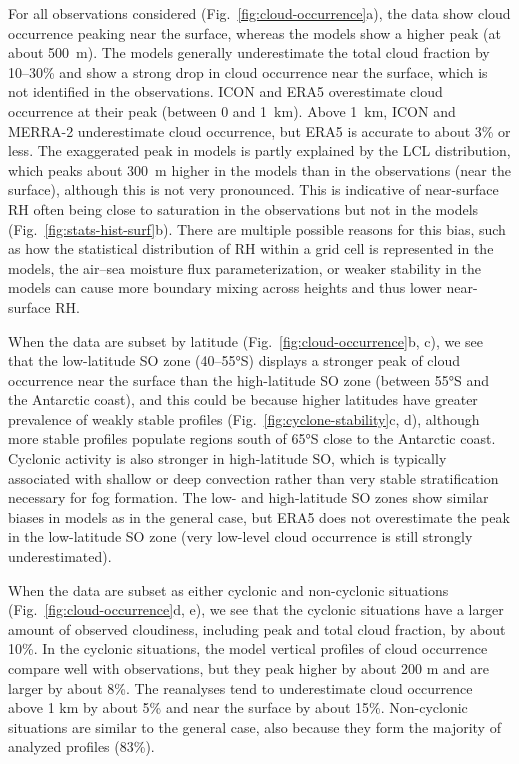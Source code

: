 \documentclass[draft]{agujournal2019}
\begin{document}
For all observations considered (Fig.~\ref{fig:cloud-occurrence}a), the data show cloud occurrence peaking near the surface, whereas the models show a higher peak (at about 500~m). The models generally underestimate the total cloud fraction by 10--30\% and show a strong drop in cloud occurrence near the surface, which is not identified in the observations. ICON and ERA5 overestimate cloud occurrence at their peak (between 0 and 1~km). Above 1~km, ICON and MERRA-2 underestimate cloud occurrence, but ERA5 is accurate to about 3\% or less. The exaggerated peak in models is partly explained by the LCL distribution, which peaks about 300~m higher in the models than in the observations (near the surface), although this is not very pronounced. This is indicative of near-surface RH often being close to saturation in the observations but not in the models (Fig.~\ref{fig:stats-hist-surf}b). There are multiple possible reasons for this bias, such as how the statistical distribution of RH within a grid cell is represented in the models, the air--sea moisture flux parameterization, or weaker stability in the models can cause more boundary mixing across heights and thus lower near-surface RH.

When the data are subset by latitude (Fig.~\ref{fig:cloud-occurrence}b, c), we see that the low-latitude SO zone (40--55°S) displays a stronger peak of cloud occurrence near the surface than the high-latitude SO zone (between 55°S and the Antarctic coast), and this could be because higher latitudes have greater prevalence of weakly stable profiles (Fig.~\ref{fig:cyclone-stability}c, d), although more stable profiles populate regions south of 65°S close to the Antarctic coast. Cyclonic activity is also stronger in high-latitude SO, which is typically associated with shallow or deep convection rather than very stable stratification necessary for fog formation. The low- and high-latitude SO zones show similar biases in models as in the general case, but ERA5 does not overestimate the peak in the low-latitude SO zone (very low-level cloud occurrence is still strongly underestimated).

When the data are subset as either cyclonic and non-cyclonic situations (Fig.~\ref{fig:cloud-occurrence}d, e), we see that the cyclonic situations have a larger amount of observed cloudiness, including peak and total cloud fraction, by about 10\%. In the cyclonic situations, the model vertical profiles of cloud occurrence compare well with observations, but they peak higher by about 200 m and are larger by about 8\%. The reanalyses tend to underestimate cloud occurrence above 1 km by about 5\% and near the surface by about 15\%. Non-cyclonic situations are similar to the general case, also because they form the majority of analyzed profiles (83\%).
\end{document}
